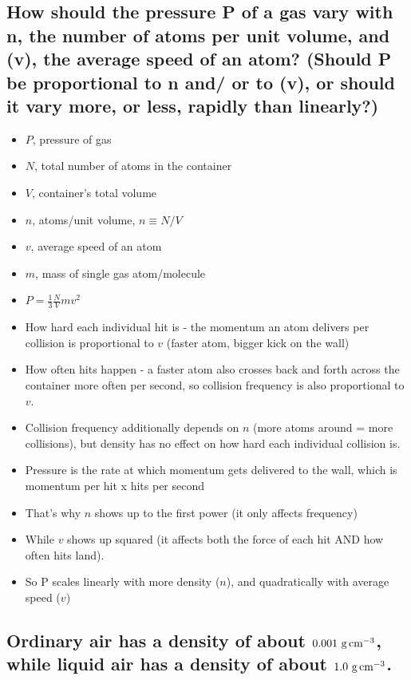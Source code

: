 \documentclass{article}
\begin{document}
\subsection{How should the pressure P of a gas vary with n, the number of atoms per unit volume, and (v), the average speed of an atom? (Should P be proportional to n and/ or to (v), or should it vary more, or less, rapidly than linearly?)}

\begin{itemize}
    \item $P$, pressure of gas
    \item $N$, total number of atoms in the container
    \item $V$, container's total volume
    \item $n$, atoms/unit volume, $n \equiv N/V$
    \item $v$, average speed of an atom
    \item $m$, mass of single gas atom/molecule
    \item $P = \frac{1}{3}\frac{N}{V}mv^2$
    \item How hard each individual hit is - the momentum an atom delivers per collision is proportional to $v$ (faster atom, bigger kick on the wall)
    \item How often hits happen - a faster atom also crosses back and forth across the container more often per second, so collision frequency is also proportional to $v$.
    \item Collision frequency additionally depends on $n$ (more atoms around = more collisions), but density has no effect on how hard each individual collision is.
    \item Pressure is the rate at which momentum gets delivered to the wall, which is momentum per hit x hits per second
    \item That's why $n$ shows up to the first power (it only affects frequency)
    \item While $v$ shows up squared (it affects both the force of each hit AND how often hits land).
    \item So P scales linearly with more density ($n$), and quadratically with average speed ($v$)

\end{itemize}

\subsection{Ordinary air has a density of about $0.001\text{ g\,cm}^{-3}$, while liquid air has a density of about $1.0\text{ g\,cm}^{-3}$.}
\end{document}
